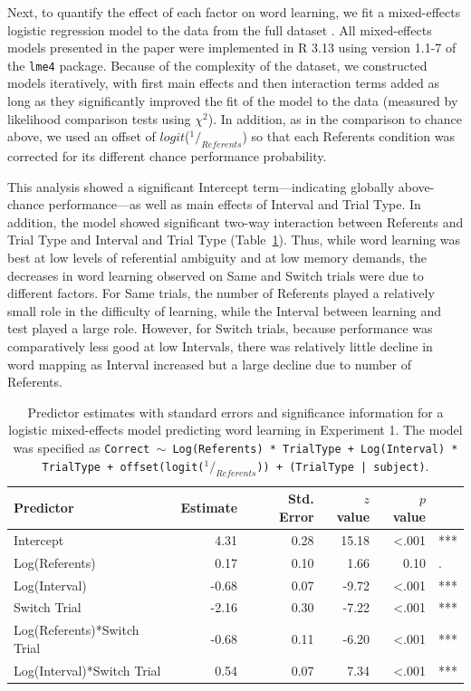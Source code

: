 \documentclass[man,floatsintext]{apa6}
\begin{document}
Next, to quantify the effect of each factor on word learning, we fit a mixed-effects logistic regression model to the data from the full dataset \cite{Baayen2008}. All mixed-effects models presented in the paper were implemented in R 3.13 using version 1.1-7 of the \texttt{lme4} package. Because of the complexity of the dataset, we constructed models iteratively, with first main effects and then interaction terms added as long as they significantly improved the fit of the model to the data (measured by likelihood comparison tests using $\chi^2$). In addition, as in the comparison to chance above, we used an offset of $logit$($^1/_{Referents}$) so that each Referents condition was corrected for its different chance performance probability. 

This analysis showed a significant Intercept term---indicating globally above-chance performance---as well as main effects of Interval and Trial Type. In addition, the model showed significant two-way interaction between Referents and Trial Type and Interval and Trial Type (Table~\ref{tab:exp1_reg}). Thus, while word learning was best at low levels of referential ambiguity and at low memory demands, the decreases in word learning observed on Same and Switch trials were due to different factors. For Same trials, the number of Referents played a relatively small role in the difficulty of learning, while the Interval between learning and test played a large role. However, for Switch trials, because performance was comparatively less good at low Intervals, there was relatively little decline in word mapping as Interval increased but a large decline due to number of Referents. 

\begin{table}[tb]
\begin{center}
\begin{tabular}{lrrrrl}
 Predictor & Estimate & Std. Error & $z$ value & $p$ value &  \\ 
  \hline
  Intercept & 4.31 & 0.28 & 15.18 & <.001 & *** \\ 
  Log(Referents) & 0.17 & 0.10 & 1.66 & 0.10 & . \\ 
  Log(Interval) & -0.68 & 0.07 & -9.72 & <.001 & *** \\ 
  Switch Trial & -2.16 & 0.30 & -7.22 & <.001 & *** \\ 
  Log(Referents)*Switch Trial & -0.68 & 0.11 & -6.20 & <.001 & *** \\ 
  Log(Interval)*Switch Trial & 0.54 & 0.07 & 7.34 & <.001 & *** \\ 
   \hline
\end{tabular}\end{center}
\vspace{6pt}
\caption{\label{tab:exp1_reg}Predictor estimates with standard errors and significance information for a logistic mixed-effects model predicting word learning in Experiment 1. The model was specified as \small{\tt{Correct $\sim$ Log(Referents) * TrialType + Log(Interval) * TrialType + offset(logit($^1/_{Referents}$)) + (TrialType | subject)}}.}
\end{table}
\end{document}
